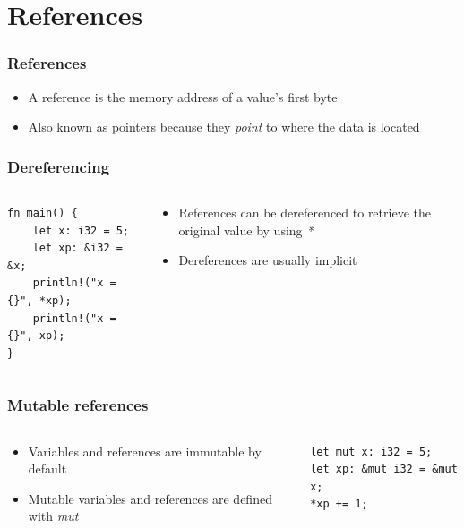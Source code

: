 \documentclass{beamer}
\begin{document}
\section{References}
\begin{frame}[fragile]
    \frametitle{References}
    \begin{itemize}
        \item A reference is the memory address of a value's first byte
        \item Also known as pointers because they \textit{point} to where the data is located
    \end{itemize}
\end{frame}
\begin{frame}[fragile]
    \frametitle{Dereferencing}
    \begin{columns}
        \begin{column}{0.5\textwidth}
        \begin{verbatim}
fn main() {
    let x: i32 = 5;
    let xp: &i32 = &x;
    println!("x = {}", *xp);
    println!("x = {}", xp);
}
        \end{verbatim}
        \end{column}
        \begin{column}{0.5\textwidth}
            \begin{itemize}
                    \item References can be dereferenced to retrieve the original value by using \textit{*}
                    \item Dereferences are usually implicit
            \end{itemize}

        \end{column}
    \end{columns}
\end{frame}
\begin{frame}[fragile]
    \frametitle{Mutable references}
    \begin{columns}
        \begin{column}{0.5\textwidth}
            \begin{itemize}
                \item Variables and references are immutable by default
                \item Mutable variables and references are defined with \textit{mut}
            \end{itemize}
        \end{column}
        \begin{column}{0.5\textwidth}
            \begin{verbatim}
let mut x: i32 = 5;
let xp: &mut i32 = &mut x;
*xp += 1;
            \end{verbatim}
        \end{column}
    \end{columns}
\end{frame}
\end{document}

